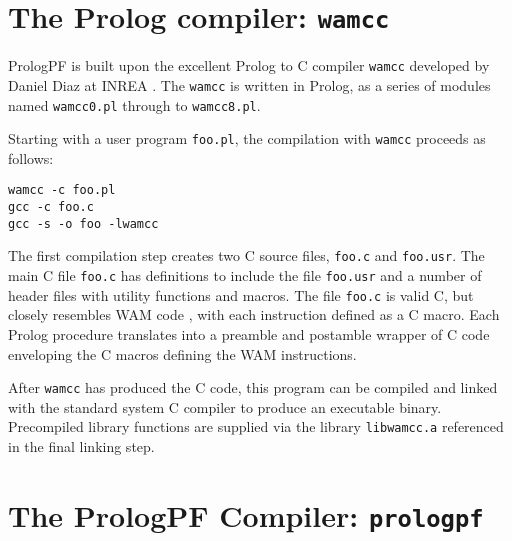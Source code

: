 \section{The Prolog compiler: \texttt{wamcc}} %

PrologPF is built upon the excellent Prolog to C compiler \texttt{wamcc}
developed by Daniel Diaz at INREA \cite{CD95}.  The \texttt{wamcc} is written
in Prolog, as a series of modules named \texttt{wamcc0.pl} through to
\texttt{wamcc8.pl}.

Starting with a user program \texttt{foo.pl}, the compilation with \texttt{wamcc}
proceeds as follows:
\begin{verbatim}
wamcc -c foo.pl
gcc -c foo.c
gcc -s -o foo -lwamcc
\end{verbatim}
The first compilation step creates two C source files, \texttt{foo.c} and
\texttt{foo.usr}.  The main C file \texttt{foo.c} has definitions to
include the file \texttt{foo.usr} and a number of header files with utility
functions and macros.  The file \texttt{foo.c} is valid C, but closely
resembles WAM code \cite{War83}, with each instruction defined as a C macro.
Each Prolog procedure translates into a preamble and postamble wrapper of C code
enveloping the C macros defining the WAM instructions.

After \texttt{wamcc} has produced the C code, this program can be compiled and
linked with the standard system C compiler to produce an executable binary.
Precompiled library functions are supplied via the library \texttt{libwamcc.a}
referenced in the final linking step.

\section{The PrologPF Compiler: \texttt{prologpf}} %

